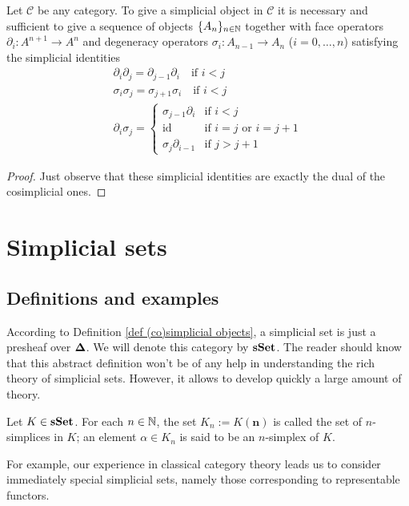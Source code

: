 \begin{cor}
Let $\mathcal C$ be any category. To give a simplicial object in $\mathcal C$ it is necessary and sufficient to give a sequence of objects $\{A_n\}_{n \in \mathbb{N}}$ together with face operators $\partial_i \colon A^{n+1} \to A^n$ and degeneracy operators $\sigma_i \colon A_{n-1} \to A_n$ ($i = 0, \ldots, n$) satisfying the simplicial identities
\begin{gather*}
\partial_i \partial_j = \partial_{j-1} \partial_i \quad \text{if } i < j \\
\sigma_i \sigma_j = \sigma_{j+1} \sigma_i \quad \text{if } i < j \\
\partial_i \sigma_j = \begin{cases} \sigma_{j-1} \partial_i & \text{if } i < j \\
\mathrm{id} & \text{if } i = j \text{ or } i = j+1 \\ \sigma_j \partial_{i-1} & \text{if } j > j+1 \end{cases}
\end{gather*}
\end{cor}

\begin{proof}
Just observe that these simplicial identities are exactly the dual of the cosimplicial ones.
\end{proof}

\section{Simplicial sets}

\subsection{Definitions and examples}

According to Definition \ref{def (co)simplicial objects}, a simplicial set is just a presheaf over $\mathbf \Delta$. We will denote this category by $\mathbf{sSet}$. The reader should know that this abstract definition won't be of any help in understanding the rich theory of simplicial sets. However, it allows to develop quickly a large amount of theory.

\begin{defin}
Let $K \in \mathbf{sSet}$. For each $n \in \mathbb{N}$, the set $K_n := K(\mathbf n)$ is called the set of $n$-simplices in $K$; an element $\alpha \in K_n$ is said to be an $n$-simplex of $K$.
\end{defin}

For example, our experience in classical category theory leads us to consider immediately special simplicial sets, namely those corresponding to representable functors.

